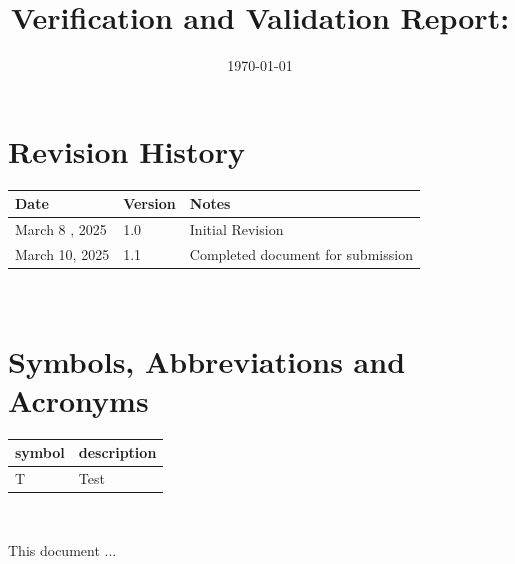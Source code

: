 \documentclass[12pt, titlepage]{article}
\begin{document}
\title{Verification and Validation Report: \progname} 
\author{\authname}
\date{\today}
	
\maketitle


\section{Revision History}

\begin{tabularx}{\textwidth}{p{3cm}p{2cm}X}
\toprule {\bf Date} & {\bf Version} & {\bf Notes}\\
\midrule
March 8 , 2025 & 1.0 & Initial Revision\\
March 10, 2025 & 1.1 & Completed document for submission\\
\bottomrule
\end{tabularx}

~\newpage

\section{Symbols, Abbreviations and Acronyms}

\renewcommand{\arraystretch}{1.2}
\begin{tabular}{l l} 
  \toprule		
  \textbf{symbol} & \textbf{description}\\
  \midrule 
  T & Test\\
  \bottomrule
\end{tabular}\\

\newpage

\tableofcontents

\listoftables %

\listoffigures %

\newpage


This document ...
\end{document}
